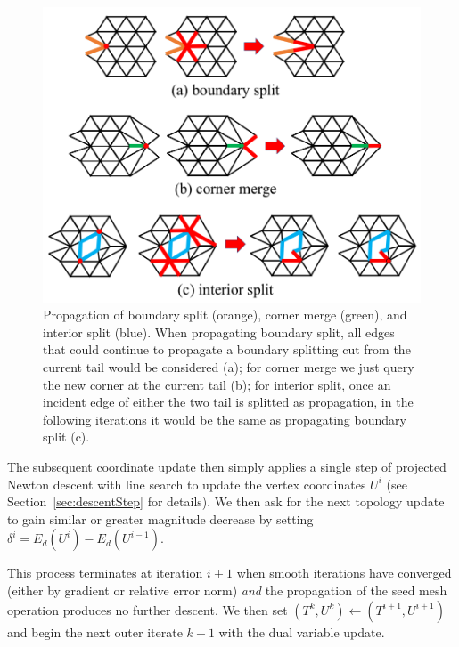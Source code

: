 \begin{figure}[t]
\centering
\includegraphics[width=0.8\linewidth]{fig/propagation.png}
\caption{Propagation of boundary split (orange), corner merge (green), and interior split (blue). When propagating boundary split, all edges that could continue to propagate a boundary splitting cut from the current tail would be considered (a); for corner merge we just query the new corner at the current tail (b); for interior split, once an incident edge of either the two tail is splitted as propagation, in the following iterations it would be the same as propagating boundary split (c).
 }
\label{fig:propagation}
\end{figure}

The subsequent coordinate update then simply applies a single step of projected Newton descent with line search to update the vertex coordinates $U^i$ (see Section~\ref{sec:descentStep} for details). We then ask for the next topology update to gain similar or greater magnitude decrease by setting $\delta^i = E_d(U^i) - E_d(U^{i-1})$.

This process terminates at iteration $i+1$ when smooth iterations have converged (either by gradient or relative error norm) \emph{and} the propagation of the seed mesh operation produces no further descent. We then set $(T^k,U^k) \leftarrow (T^{i+1},U^{i+1})$ and begin the next outer iterate $k+1$ with the dual variable update. 


